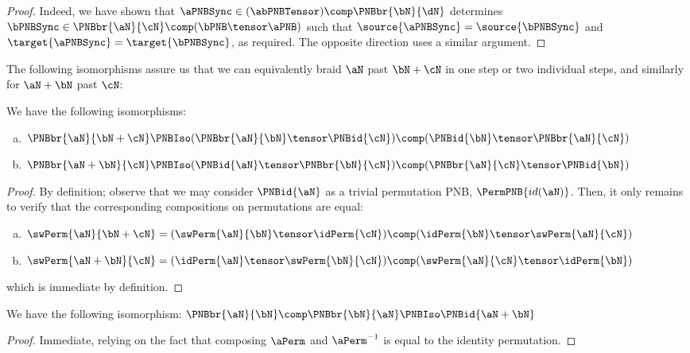 \begin{proof}
    Indeed, we have shown that $\aPNBSync \in (\abPNBTensor) \comp
    \PNBbr{\bN}{\dN}$ determines $\bPNBSync \in \PNBbr{\aN}{\cN} \comp
    (\bPNB \tensor \aPNB)$ such that $\source{\aPNBSync} = \source{\bPNBSync}$
    and $\target{\aPNBSync} = \target{\bPNBSync}$, as required. The opposite
    direction uses a similar argument.
\end{proof}

The following isomorphisms assure us that we can equivalently braid $\aN$ past
$\bN + \cN$ in one step or two individual steps, and similarly for $\aN + \bN$
past $\cN$:

\begin{proposition}\label{prop:braidingHexagonAxioms}
    We have the following isomorphisms:
    \begin{enumerate}[(a)]
        \item $\PNBbr{\aN}{\bN + \cN} \PNBIso (\PNBbr{\aN}{\bN} \tensor
            \PNBid{\cN}) \comp (\PNBid{\bN} \tensor \PNBbr{\aN}{\cN})$
        \item $\PNBbr{\aN + \bN}{\cN} \PNBIso (\PNBid{\aN} \tensor
            \PNBbr{\bN}{\cN}) \comp ( \PNBbr{\aN}{\cN}\tensor \PNBid{\bN})$
    \end{enumerate}
\end{proposition}
\begin{proof}
    By definition; observe that we may consider $\PNBid{\aN}$ as a trivial
    permutation PNB, $\PermPNB{id(\aN)}$. Then, it only remains to verify that
    the corresponding compositions on permutations are equal:

    \begin{enumerate}[(a)]
        \item $\swPerm{\aN}{\bN+\cN} = (\swPerm{\aN}{\bN} \tensor \idPerm{\cN})
            \comp (\idPerm{\bN} \tensor \swPerm{\aN}{\cN})$
        \item $\swPerm{\aN + \bN}{\cN} = (\idPerm{\aN} \tensor
            \swPerm{\bN}{\cN}) \comp (\swPerm{\aN}{\cN}\tensor \idPerm{\bN})$
    \end{enumerate}

    which is immediate by definition.
\end{proof}

\begin{proposition}\label{prop:braidingSymmetric}
    We have the following isomorphism: $\PNBbr{\aN}{\bN} \comp \PNBbr{\bN}{\aN}
    \PNBIso \PNBid{\aN + \bN}$
\end{proposition}
\begin{proof}
    Immediate, relying on the fact that composing $\aPerm$ and $\aPerm^{-1}$ is
    equal to the identity permutation.
\end{proof}

